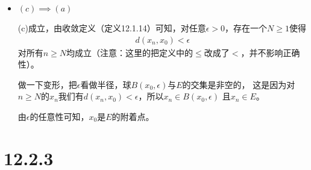 \documentclass{article}
\begin{document}
\begin{itemize}
      \item $(c) \implies (a)$

            (c)成立，由收敛定义（定义12.1.14）可知，对任意$\epsilon > 0$，存在一个$N \geq 1$使得
            \begin{align*}
                  d(x_n, x_0) < \epsilon
            \end{align*}
            对所有$n \geq N$均成立（注意：这里的把定义中的$\leq$改成了$<$，并不影响正确性）。

            做一下变形，把$\epsilon$看做半径，球$B(x_0, \epsilon)$与$E$的交集是非空的，
            这是因为对$n \geq N$的$x_n$我们有$d(x_n, x_0) < \epsilon$，所以$x_n \in B(x_0, \epsilon)$
            且$x_n \in E$。

            由$\epsilon$的任意性可知，$x_0$是$E$的附着点。
\end{itemize}

\section*{12.2.3}
\end{document}
